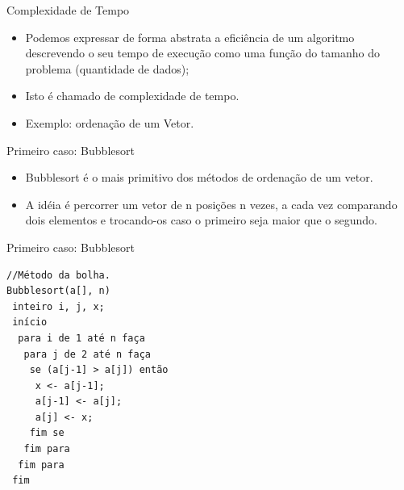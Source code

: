 \documentclass[12pt,table,xcolor={dvipsnames}]{beamer}
\begin{document}
\begin{frame}[fragile]{Complexidade de Tempo}
\begin{itemize}
\item Podemos expressar de forma abstrata a eficiência de um algoritmo descrevendo o seu tempo de execução como uma função do tamanho do problema (quantidade de dados);
\item Isto é chamado de complexidade de tempo.
\item Exemplo: ordenação de um Vetor.
\end{itemize}
\end{frame}

\begin{frame}[fragile]{Primeiro caso: Bubblesort}
\begin{itemize}
\item Bubblesort é o mais primitivo dos métodos de ordenação de um vetor.
\item  A idéia é percorrer um vetor de n posições n vezes, a cada vez comparando dois elementos e trocando-os caso o primeiro seja maior que o segundo.
\end{itemize}
\end{frame}

\begin{frame}[fragile]{Primeiro caso: Bubblesort}
\begin{lstlisting}
//Método da bolha.
Bubblesort(a[], n)
 inteiro i, j, x;
 início
  para i de 1 até n faça
   para j de 2 até n faça
    se (a[j-1] > a[j]) então
     x <- a[j-1];
     a[j-1] <- a[j];
     a[j] <- x;
    fim se
   fim para
  fim para
 fim
\end{lstlisting}
\end{frame}
\end{document}
